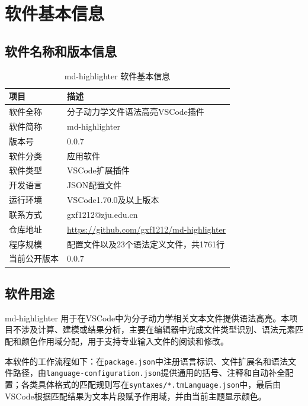 
\section{软件基本信息}

\subsection{软件名称和版本信息}

\begin{table}[h]
\centering
\caption{md-highlighter 软件基本信息}
\begin{tabular}{p{3cm}p{10cm}}
\toprule
\textbf{项目} & \textbf{描述} \\
\midrule
软件全称 & 分子动力学文件语法高亮VSCode插件 \\
软件简称 & md-highlighter \\
版本号 & 0.0.7 \\
软件分类 & 应用软件 \\
软件类型 & VSCode扩展插件 \\
开发语言 & JSON配置文件 \\
运行环境 & VSCode1.70.0及以上版本 \\
联系方式 & gxf1212@zju.edu.cn \\
仓库地址 & \href{https://github.com/gxf1212/md-highlighter}{https://github.com/gxf1212/md-highlighter} \\
程序规模 & 配置文件以及23个语法定义文件，共1761行 \\
当前公开版本 & 0.0.7 \\
\bottomrule
\end{tabular}
\end{table}

\subsection{软件用途}

md-highlighter 用于在VSCode中为分子动力学相关文本文件提供语法高亮。本项目不涉及计算、建模或结果分析，主要在编辑器中完成文件类型识别、语法元素匹配和颜色作用域分配，用于支持专业输入文件的阅读和修改。

本软件的工作流程如下：在\lstinline|package.json|中注册语言标识、文件扩展名和语法文件路径，由\lstinline|language-configuration.json|提供通用的括号、注释和自动补全配置；各类具体格式的匹配规则写在\lstinline|syntaxes/*.tmLanguage.json|中，最后由VSCode根据匹配结果为文本片段赋予作用域，并由当前主题显示颜色。

